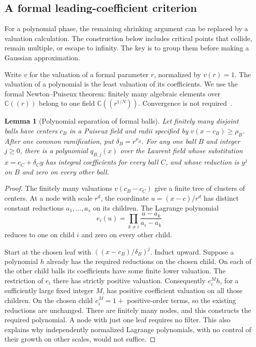 \documentclass[11pt]{article}
\newtheorem{lemma}[theorem]{Lemma}
\theoremstyle{definition}\newtheorem{definition}[theorem]{Definition}
\theoremstyle{remark}\newtheorem{remark}[theorem]{Remark}
\newcommand{\C}{\mathbb C}
\begin{document}
\subsection{A formal leading-coefficient criterion}\label{sec:stationaryballs}

For a polynomial phase, the remaining shrinking argument can be
replaced by a valuation calculation. The construction below includes
critical points that collide, remain multiple, or escape to infinity.
The key is to group them before making a Gaussian approximation.

Write $v$ for the valuation of a formal parameter $r$, normalized by
$v(r)=1$. The valuation of a polynomial is the least valuation of its
coefficients. We use the formal Newton--Puiseux theorem: finitely many
algebraic elements over $\C((r))$ belong to one field
$\C((r^{1/N}))$. Convergence is not required~\cite[Chapter~2]{Wall}.

\begin{lemma}[Polynomial separation of formal balls]\label{lem:ballseparation}
Let finitely many disjoint balls have centers $c_B$ in a Puiseux field
and radii specified by $v(x-c_B)\geq\rho_B$. After one common
ramification, put $\delta_B=r^{\rho_B}$. For any one ball $B$ and
integer $j\geq0$, there is a polynomial $q_{B,j}(x)$ over the Laurent
field whose substitution $x=c_C+\delta_C y$ has integral coefficients
for every ball $C$, and whose reduction is $y^j$ on $B$ and zero on
every other ball.
\end{lemma}
\begin{proof}
The finitely many valuations $v(c_B-c_C)$ give a finite tree of
clusters of centers. At a node with scale $r^d$, the coordinate
$u=(x-c)/r^d$ has distinct constant reductions $a_1,\ldots,a_s$
on its children. The Lagrange polynomial
\[
 e_i(u)=\prod_{k\ne i}\frac{u-a_k}{a_i-a_k}
\]
reduces to one on child $i$ and zero on every other child.

Start at the chosen leaf with $((x-c_B)/\delta_B)^j$. Induct upward.
Suppose a polynomial $h$ already has the required reductions on the
chosen child. On each of the other child balls its coefficients have
some finite lower valuation. The restriction of $e_i$ there has
strictly positive valuation. Consequently $e_i^M h$, for a sufficiently
large fixed integer $M$, has positive coefficient valuation on all
those children. On the chosen child $e_i^M=1+$ positive-order terms,
so the existing reductions are unchanged. There are finitely many
nodes, and this constructs the required polynomial. A node with just
one leaf requires no filter. This also explains why independently
normalized Lagrange polynomials, with no control of their growth on
other scales, would not suffice.
\end{proof}
\end{document}
